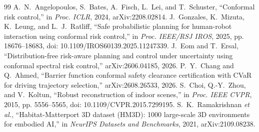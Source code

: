 \documentclass[conference]{IEEEtran}
\theoremstyle{definition}
\begin{document}
\begin{thebibliography}{99}
 A.~N.~Angelopoulos, S.~Bates, A.~Fisch, L.~Lei, and T.~Schuster, ``Conformal risk control,'' in \emph{Proc. ICLR}, 2024, arXiv:2208.02814.
 J.~Gonzales, K.~Mizuta, K.~Leung, and L.~J.~Ratliff, ``Safe probabilistic planning for human-robot interaction using conformal risk control,'' in \emph{Proc. IEEE/RSJ IROS}, 2025, pp. 18676--18683, doi: 10.1109/IROS60139.2025.11247339.
 J.~Eom and T.~Ersal, ``Distribution-free risk-aware planning and control under uncertainty using conformal spectral risk control,'' arXiv:2606.04185, 2026.
 P.~Y.~Chang and Q.~Ahmed, ``Barrier function conformal safety clearance certification with CVaR for driving trajectory selection,'' arXiv:2608.26533, 2026.
 S.~Choi, Q.-Y.~Zhou, and V.~Koltun, ``Robust reconstruction of indoor scenes,'' in \emph{Proc. IEEE CVPR}, 2015, pp. 5556--5565, doi: 10.1109/CVPR.2015.7299195.
 S.~K.~Ramakrishnan \emph{et al.}, ``Habitat-Matterport 3D dataset (HM3D): 1000 large-scale 3D environments for embodied AI,'' in \emph{NeurIPS Datasets and Benchmarks}, 2021, arXiv:2109.08238.
\end{thebibliography}
\end{document}
